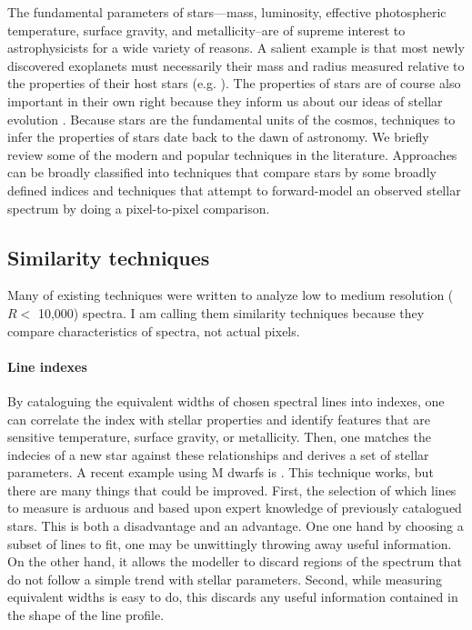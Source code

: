 \documentclass[preprint]{aastex} %
\begin{document}
The fundamental parameters of stars---mass, luminosity, effective photospheric temperature, surface gravity, and metallicity--are of supreme interest to astrophysicists for a wide variety of reasons. A salient example is that most newly discovered exoplanets must necessarily their mass and radius measured relative to the properties of their host stars (e.g. \citealt{tfs+12,blj+12,ssm+13}). The properties of stars are of course also important in their own right because they inform us about our ideas of stellar evolution \citep{dm97, bca+02}. Because stars are the fundamental units of the cosmos, techniques to infer the properties of stars date back to the dawn of astronomy. We briefly review some of the modern and popular techniques in the literature. Approaches can be broadly classified into techniques that compare stars by some broadly defined indices and techniques that attempt to forward-model an observed stellar spectrum by doing a pixel-to-pixel comparison.

\subsection{Similarity techniques}
Many of existing techniques were written to analyze low to medium resolution ($R < $ 10,000) spectra. I am calling them similarity techniques because they compare characteristics of spectra, not actual pixels.

\paragraph{Line indexes} By cataloguing the equivalent widths of chosen spectral lines into indexes, one can correlate the index with stellar properties and identify features that are sensitive temperature, surface gravity, or metallicity. Then, one matches the indecies of a new star against these relationships and derives a set of stellar parameters. A recent example using M dwarfs is \citet{nci+14}. This technique works, but there are many things that could be improved. First, the selection of which lines to measure is arduous and based upon expert knowledge of previously catalogued stars. This is both a disadvantage and an advantage. One one hand by choosing a subset of lines to fit, one may be unwittingly throwing away useful information. On the other hand, it allows the modeller to discard regions of the spectrum that do not follow a simple trend with stellar parameters. Second, while measuring equivalent widths is easy to do, this discards any useful information contained in the shape of the line profile. 
\end{document}
